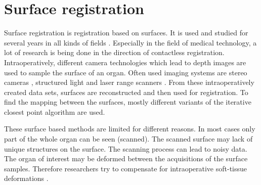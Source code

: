 
\section{Surface registration}
Surface registration is registration based on surfaces. It is used and studied
for several years in all kinds of fields \cite{ramos2015review}. Especially in
the field of medical technology, a lot of research is being done in the
direction of contactless registration. Intraoperatively, different camera technologies which lead
to depth images are used to sample the surface of an organ. Often used imaging systems are stereo cameras
\cite{furukawa2010accurate}, structured light \cite{salvi2004pattern} and
laser range scanners \cite{cash2003incorporation}. From these intraoperatively
created data sets, surfaces are reconstructed and then used for registration. To
find the mapping between the surfaces, mostly different variants of the iterative
closest point \cite{besl1992method} algorithm are used. 

These surface based methods are limited for different reasons. In most cases
only part of the whole organ can be seen (scanned). The scanned surface may lack
of unique structures on the surface. The scanning process can 
lead to noisy data. The organ of interest may be deformed between the
acquisitions of the surface samples. Therefore researchers try to compensate for
intraoperative soft-tissue deformations \cite{cash2005compensating}\cite{dagon2008real}.

